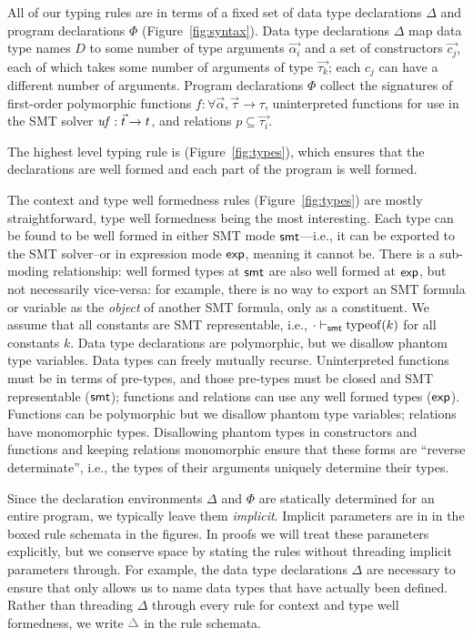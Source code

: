 \documentclass[acmsmall,screen,nonacm]{acmart}
\theoremstyle{definition}
\begin{document}
All of our typing rules are in terms of a fixed set of data type
declarations $\Delta$ and program declarations $\Phi$
(Figure~\ref{fig:syntax}). Data type declarations $\Delta$ map data type
names $D$ to some number of type arguments $\vec{\alpha_i}$ and a set
of constructors $\vec{c_j}$, each of which takes some number of
arguments of type $\vec{\tau_k}$; each $c_j$ can have a different
number of arguments.
%
Program declarations $\Phi$ collect the signatures of first-order
polymorphic functions
$f:\forall \vec{\alpha}, \vec{\tau} \rightarrow \tau$, uninterpreted
functions for use in the SMT solver $\mathit{uf}:\vec{t} \rightarrow t$, and
relations $p \subseteq \vec{\tau_i}$.

The highest level typing rule is 
(Figure~\ref{fig:types}), which ensures that the declarations are well
formed and each part of the program is well formed.

The context and type well formedness rules (Figure~\ref{fig:types})
are mostly straightforward,
%
type well formedness being the most interesting. Each type can be
found to be well formed in either SMT mode $\mathsf{smt}$---i.e., it can be
exported to the SMT solver--or in expression mode $\mathsf{exp}$, meaning it
cannot be. There is a sub-moding relationship: well formed types at
$\mathsf{smt}$ are also well formed at $\mathsf{exp}$, but not necessarily
vice-versa: for example, there is no way to export an SMT formula or
variable as the \emph{object} of another SMT formula, only as a
constituent.
%
We assume that all \Name constants are SMT representable, i.e.,
$\cdot \vdash_{\mathsf{smt}} \mathrm{typeof}(k)$ for all constants $k$.
%
Data type declarations are polymorphic, but we disallow phantom type
variables. Data types can freely mutually recurse.
%
Uninterpreted functions must be in terms of pre-types, and those
pre-types must be closed and SMT representable ($\mathsf{smt}$); 
%
functions and relations can use any well formed types ($\mathsf{exp}$).
%
Functions can be polymorphic but we disallow phantom type variables;
relations have monomorphic types.
%
Disallowing phantom types in constructors and functions and keeping
relations monomorphic ensure that these forms are ``reverse
determinate'', i.e., the types of their arguments uniquely determine their types.

Since the declaration environments $\Delta$ and $\Phi$ are statically
determined for an entire program, we typically leave
them \emph{implicit}.
%
Implicit parameters are in  in the boxed rule schemata
in the figures. In proofs we will treat these parameters explicitly,
but we conserve space by stating the rules without threading implicit
parameters through.
%
For example, the data type declarations $\Delta$ are necessary to
ensure that  only allows us to name data types that have
actually been defined. Rather than threading $\Delta$ through every
rule for context and type well formedness, we write
$\implicit{\Delta}$ in the rule schemata.
\end{document}

